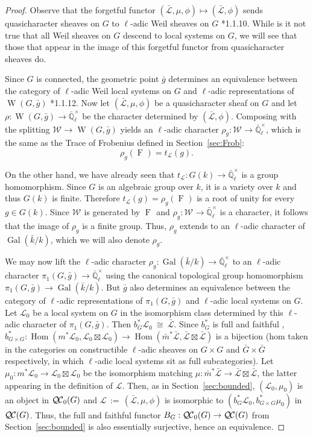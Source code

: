 \documentclass{amsart}
\theoremstyle{plain}
\theoremstyle{definition}
\theoremstyle{remark}
\newcommand{\EE}{\mathbb{\bar Q}_\ell}
\newcommand{\bFq}{\bar{k}}
\newcommand{\Fq}{k}
\newcommand{\EEx}{\EE^\times}
\newcommand{\Weil}[1]{\mathcal{W}_{#1}}
\DeclareMathOperator{\Gal}{Gal}
\DeclareMathOperator{\W}{W}
\newcommand{\Frob}[1]{\operatorname{F}_{#1}}
\DeclareMathOperator{\Hom}{Hom}
\newcommand{\ceq}{{\, :=\, }}
\newcommand{\iso}{{\ \cong\ }}
\newcommand{\qcs}[1]{{\mathcal{#1}}}
\newcommand{\gqcs}[1]{{\mathcal{\bar #1}}}
\newcommand{\QC}{{\mathcal{Q\hskip-0.8pt C}}}
\newcommand{\QCb}{{\QC_0}}
\newcommand{\trFrob}[1]{t_{#1}}
\newcommand{\bg}{\bar{g}}
\begin{document}
\begin{proof}
  Observe that the forgetful functor $(\gqcs{L},\mu,\phi) \mapsto (\gqcs{L},\phi)$
  sends quasicharacter sheaves on $G$ to $\ell$-adic Weil sheaves on $G$ \cite{deligne:80a}*{1.1.10}.
  While is it not true that all Weil sheaves on $G$ descend to local systems on $G$,
  we will see that those that appear in the image of this forgetful functor from quasicharacter sheaves do.

  Since $G$ is connected, the geometric point $\bg$ determines
  an equivalence between the category of $\ell$-adic Weil local systems on $G$ and
  $\ell$-adic representations of $\W(G,\bg)$ \cite{deligne:80a}*{1.1.12}.
  Now let $(\gqcs{L},\mu,\phi)$ be a quasicharacter sheaf on $G$
  and let $\rho : \W(G, \bg) \to \EEx$ be the character determined by $(\gqcs{L},\phi)$.
  Composing with the splitting $\Weil{} \to \W(G,\bg)$ yields an $\ell$-adic character
  $\rho_g : \Weil{} \to \EEx$, which is the same as the Trace of Frobenius defined in Section~\ref{sec:Frob}:
  \[
  \rho_g(\Frob{}) =  \trFrob{\qcs{L}}(g).
  \]

  On the other hand, we have already seen that $\trFrob{\qcs{L}} : G(\Fq) \to \EEx$
  is a group homomorphism. Since $G$ is an algebraic group over $\Fq$, it is a
  variety over $\Fq$ and thus $G(\Fq)$ is finite.
  Therefore $\trFrob{\qcs{L}}(g) = \rho_g(\Frob{})$ is a root of unity
  for every $g\in G(\Fq)$.  Since $\Weil{}$ is generated by
  $\Frob{}$ and $\rho_g : \Weil{} \to \EEx$ is
  a character, it follows that the image of $\rho_g$ is a finite group.
  Thus, $\rho_g$ extends to an $\ell$-adic character of $\Gal(\bFq/\Fq)$,
  which we will also denote $\rho_g$.

  We may now lift the $\ell$-adic character $\rho_g : \Gal(\bFq/\Fq) \to \EEx$
  to an $\ell$-adic character $\pi_1(G,\bg) \to \EEx$ using the canonical topological group homomorphism
  $\pi_1(G,\bg) \to \Gal(\bFq/\Fq)$. But $\bg$ also
  determines an equivalence between the category of $\ell$-adic
  representations of $\pi_1(G,\bg)$ and $\ell$-adic local systems on $G$. Let
  $\qcs{L}_0$ be a local system on $G$ in the isomorphism class
  determined by this $\ell$-adic character of $\pi_1(G,\bg)$.
  Then $b_G^*\qcs{L}_0 \iso \gqcs{L}$.
  Since $b_G^*$ is full and faithful
  ,
  $
  b_{G\times G}^* : \Hom(m^*\qcs{L}_0,\qcs{L}_0\boxtimes\qcs{L}_0) \to \Hom({\bar m}^*\gqcs{L},\gqcs{L}\boxtimes\gqcs{L})
  $
  is a bijection
  (hom taken in the categories on constructible $\ell$-adic sheaves on
  $G\times G$ and ${\bar G}\times {\bar G}$ respectively,
  in which $\ell$-adic local systems sit as full subcategories).
  Let $\mu_0 : m^*\qcs{L}_0 \to \qcs{L}_0\boxtimes\qcs{L}_0$ be the isomorphism matching
  $\mu : {\bar m}^*\gqcs{L} \to \gqcs{L}\boxtimes\gqcs{L}$,
  the latter appearing in the definition of $\qcs{L}$.
  Then, as in Section~\ref{sec:bounded}, $(\qcs{L}_0,\mu_0)$ is an object in $\QCb(G)$
  and $\qcs{L} \ceq (\gqcs{L},\mu,\phi)$ is isomorphic to $(b_G^*\qcs{L}_0,b_{G\times G}^*\mu_0)$ in $\QC(G)$.
  Thus, the full and faithful functor $B_G : \QCb(G) \to \QC(G)$ from Section~\ref{sec:bounded}
  is also essentially surjective, hence an equivalence.


\end{proof}
\end{document}
